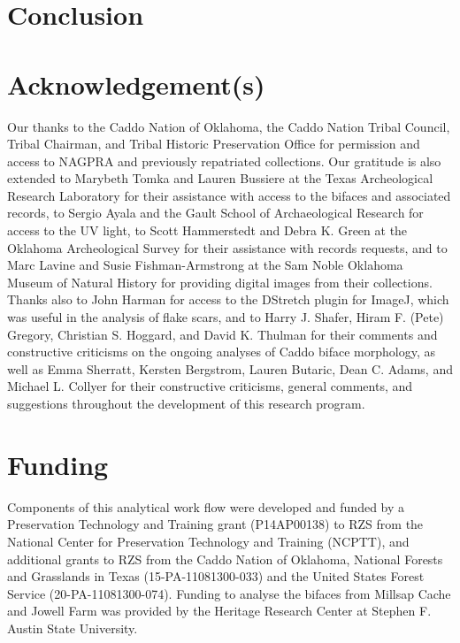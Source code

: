 \documentclass[]{interact}
\theoremstyle{plain}%
\theoremstyle{definition}
\theoremstyle{remark}
\begin{document}
\hypertarget{conclusion}{%
\section{Conclusion}\label{conclusion}}

\hypertarget{acknowledgements}{%
\section*{Acknowledgement(s)}\label{acknowledgements}}

Our thanks to the Caddo Nation of Oklahoma, the Caddo Nation Tribal
Council, Tribal Chairman, and Tribal Historic Preservation Office for
permission and access to NAGPRA and previously repatriated collections.
Our gratitude is also extended to Marybeth Tomka and Lauren Bussiere at
the Texas Archeological Research Laboratory for their assistance with
access to the bifaces and associated records, to Sergio Ayala and the
Gault School of Archaeological Research for access to the UV light, to
Scott Hammerstedt and Debra K. Green at the Oklahoma Archeological
Survey for their assistance with records requests, and to Marc Lavine
and Susie Fishman-Armstrong at the Sam Noble Oklahoma Museum of Natural
History for providing digital images from their collections. Thanks also
to John Harman for access to the DStretch plugin for ImageJ, which was
useful in the analysis of flake scars, and to Harry J. Shafer, Hiram F.
(Pete) Gregory, Christian S. Hoggard, and David K. Thulman for their
comments and constructive criticisms on the ongoing analyses of Caddo
biface morphology, as well as Emma Sherratt, Kersten Bergstrom, Lauren
Butaric, Dean C. Adams, and Michael L. Collyer for their constructive
criticisms, general comments, and suggestions throughout the development
of this research program.

\hypertarget{funding}{%
\section*{Funding}\label{funding}}

Components of this analytical work flow were developed and funded by a
Preservation Technology and Training grant (P14AP00138) to RZS from the
National Center for Preservation Technology and Training (NCPTT), and
additional grants to RZS from the Caddo Nation of Oklahoma, National
Forests and Grasslands in Texas (15-PA-11081300-033) and the United
States Forest Service (20-PA-11081300-074). Funding to analyse the
bifaces from Millsap Cache and Jowell Farm was provided by the Heritage
Research Center at Stephen F. Austin State University.
\end{document}
